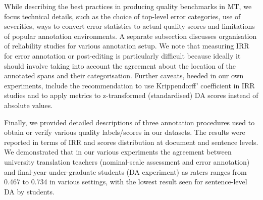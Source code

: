 While describing the best practices in producing quality benchmarks in MT, we focus technical details, such as the choice of top-level error categories, use of severities, ways to convert error statistics to actual quality scores and limitations of popular annotation environments. 
A separate subsection discusses organisation of reliability studies for various annotation setup. We note that measuring IRR for error annotation or post-editing is particularly difficult because ideally it should involve taking into account the agreement about the location of the annotated spans and their categorisation. Further caveats, heeded in our own experiments, include the recommendation to use Krippendorff' coefficient in IRR studies and to apply metrics to z-transformed (standardised) DA scores instead of absolute values. 

Finally, we provided detailed descriptions of three annotation procedures used to obtain or verify various quality labels/scores in our datasets. The results were reported in terms of IRR and scores distribution at document and sentence levels. We demonstrated that in our various experiments the agreement between university translation teachers (nominal-scale assessment and error annotation) and final-year under-graduate students (DA experiment) as raters ranges from 0.467 to 0.734 in various settings, with the lowest result seen for sentence-level DA by students.
